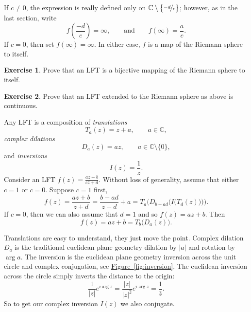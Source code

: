 \documentclass[12pt,openany]{book}
\newcommand{\sabs}[1]{\lvert {#1} \rvert}
\newcommand{\C}{{\mathbb{C}}}
\theoremstyle{plain}
\theoremstyle{remark}
\theoremstyle{definition}
\newenvironment{exbox}{%
    \def\FrameCommand{\vrule width 1pt \relax\hspace{10pt}}%
    \MakeFramed{\advance\hsize-\width\FrameRestore}%
}{%
    \endMakeFramed
}
\theoremstyle{exercise}
\newtheorem{exercise}{Exercise}[section]
\theoremstyle{example}
\newcommand{\figureref}[1]{\hyperref[#1]{Figure~\ref*{#1}}}
\begin{document}
If $c\not=0$,
the expression is really defined only on
$\C \setminus \bigl\{ \nicefrac{-d}{c} \bigr\}$;
however, as in the last section, write
\begin{equation*}
f\left(\frac{-d}{c}\right) = \infty, \qquad \text{and} \qquad
f(\infty) = \frac{a}{c} .
\end{equation*}
If $c=0$, then set $f(\infty) = \infty$.  In either case, $f$ is a map of
the Riemann sphere to itself.

\begin{exbox}
\begin{exercise}%
Prove that an LFT is a bijective mapping of the Riemann sphere to itself.
\end{exercise}

\begin{exercise}%
Prove that an LFT extended to the Riemann sphere as above is continuous.
\end{exercise}
\end{exbox}

Any LFT is a composition of \emph{translations}
\begin{equation*}
T_a(z) = z + a , \qquad a \in \C,
\end{equation*}
\emph{complex dilations}
\begin{equation*}
D_a(z) = az , \qquad a \in \C \setminus \{ 0 \} ,
\end{equation*}
and \emph{inversions}
\begin{equation*}
I(z) = \frac{1}{z}.
\end{equation*}
Consider an LFT $f(z) = \frac{az+b}{cz+d}$.
Without loss of generality, assume that either $c=1$ or $c=0$.
Suppose $c=1$ first,
\begin{equation*}
f(z)
=
\frac{a z + b}{z + d}
=
\frac{b-ad}{z+d}+a
=
T_a\biggr(D_{b-ad}\Bigr(I\bigl(T_d(z)\bigr)\Bigr)\biggr) .
\end{equation*}
If $c=0$, then we can also assume that $d=1$ and
so $f(z) = az + b$.
Then
\begin{equation*}
f(z) = az+b = T_b\bigl(D_a(z)\bigr) .
\end{equation*}

Translations are easy to understand, they just move the point.  Complex
dilation $D_a$ is the traditional euclidean plane geometry dilation by $\sabs{a}$
and rotation by $\arg a$.  The inversion is the euclidean plane geometry inversion
across the unit circle
and complex conjugation, see \figureref{fig:inversion}.  The euclidean
inversion across the circle simply inverts the distance to the origin:
\begin{equation*}
\frac{1}{\sabs{z}} e^{i \arg z} = 
\frac{\sabs{z}}{\sabs{z}^2} e^{i \arg z} = \frac{1}{\bar{z}} .
\end{equation*}
So to get our complex inversion $I(z)$ we also conjugate.
\end{document}
